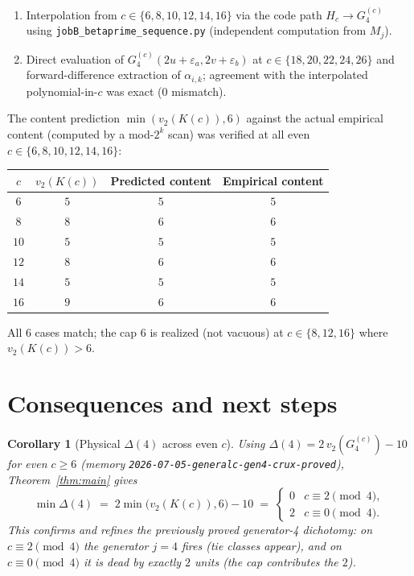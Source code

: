 \documentclass[11pt]{article}
\newtheorem{corollary}[theorem]{Corollary}
\begin{document}
\begin{enumerate}
\item Interpolation from $c \in \{6, 8, 10, 12, 14, 16\}$ via the code path
$H_c \to G_4^{(c)}$ using \texttt{jobB\_betaprime\_sequence.py} (independent computation
from $M_j$).
\item Direct evaluation of $G_4^{(c)}(2u+\varepsilon_a, 2v+\varepsilon_b)$ at $c \in \{18, 20, 22, 24, 26\}$
and forward-difference extraction of $\alpha_{i,k}$; agreement with the interpolated
polynomial-in-$c$ was exact ($0$ mismatch).
\end{enumerate}

The content prediction $\min(v_2(K(c)), 6)$ against the actual empirical content
(computed by a mod-$2^k$ scan) was verified at all even $c \in \{6, 8, 10, 12, 14, 16\}$:
\begin{center}
\begin{tabular}{|c|c|c|c|}
\hline
$c$ & $v_2(K(c))$ & Predicted content & Empirical content \\
\hline
$6$ & $5$ & $5$ & $5$ \\
$8$ & $8$ & $6$ & $6$ \\
$10$ & $5$ & $5$ & $5$ \\
$12$ & $8$ & $6$ & $6$ \\
$14$ & $5$ & $5$ & $5$ \\
$16$ & $9$ & $6$ & $6$ \\
\hline
\end{tabular}
\end{center}

All $6$ cases match; the cap $6$ is realized (not vacuous) at $c \in \{8, 12, 16\}$
where $v_2(K(c)) > 6$.

\section{Consequences and next steps}

\begin{corollary}[Physical $\Delta(4)$ across even $c$]
Using $\Delta(4) = 2\,v_2(G_4^{(c)}) - 10$ for even $c \ge 6$ (memory
\texttt{2026-07-05-generalc-gen4-crux-proved}), Theorem~\ref{thm:main} gives
\[
  \min \Delta(4) \;=\; 2\min\bigl(v_2(K(c)), 6\bigr) - 10 \;=\; \begin{cases}
  0 & c \equiv 2 \pmod 4, \\
  2 & c \equiv 0 \pmod 4.
  \end{cases}
\]
This confirms and refines the previously proved generator-4 dichotomy: on $c \equiv 2 \pmod 4$
the generator $j = 4$ fires (tie classes appear), and on $c \equiv 0 \pmod 4$ it is dead
by exactly $2$ units (the cap contributes the $2$).
\end{corollary}
\end{document}
